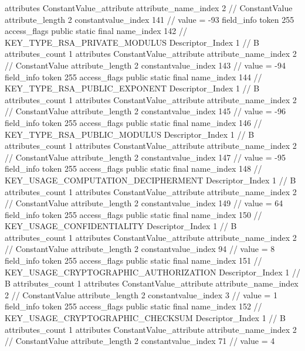 {{{{{				attributes {
				ConstantValue_attribute {
					attribute_name_index	2		// ConstantValue
					attribute_length	2
					constantvalue_index	141		// value = -93
				}
				}
			}
			field_info {
				token	255
				access_flags	public static final
				name_index	142		// KEY_TYPE_RSA_PRIVATE_MODULUS
				Descriptor_Index	1		// B
				attributes_count	1
				attributes {
				ConstantValue_attribute {
					attribute_name_index	2		// ConstantValue
					attribute_length	2
					constantvalue_index	143		// value = -94
				}
				}
			}
			field_info {
				token	255
				access_flags	public static final
				name_index	144		// KEY_TYPE_RSA_PUBLIC_EXPONENT
				Descriptor_Index	1		// B
				attributes_count	1
				attributes {
				ConstantValue_attribute {
					attribute_name_index	2		// ConstantValue
					attribute_length	2
					constantvalue_index	145		// value = -96
				}
				}
			}
			field_info {
				token	255
				access_flags	public static final
				name_index	146		// KEY_TYPE_RSA_PUBLIC_MODULUS
				Descriptor_Index	1		// B
				attributes_count	1
				attributes {
				ConstantValue_attribute {
					attribute_name_index	2		// ConstantValue
					attribute_length	2
					constantvalue_index	147		// value = -95
				}
				}
			}
			field_info {
				token	255
				access_flags	public static final
				name_index	148		// KEY_USAGE_COMPUTATION_DECIPHERMENT
				Descriptor_Index	1		// B
				attributes_count	1
				attributes {
				ConstantValue_attribute {
					attribute_name_index	2		// ConstantValue
					attribute_length	2
					constantvalue_index	149		// value = 64
				}
				}
			}
			field_info {
				token	255
				access_flags	public static final
				name_index	150		// KEY_USAGE_CONFIDENTIALITY
				Descriptor_Index	1		// B
				attributes_count	1
				attributes {
				ConstantValue_attribute {
					attribute_name_index	2		// ConstantValue
					attribute_length	2
					constantvalue_index	94		// value = 8
				}
				}
			}
			field_info {
				token	255
				access_flags	public static final
				name_index	151		// KEY_USAGE_CRYPTOGRAPHIC_AUTHORIZATION
				Descriptor_Index	1		// B
				attributes_count	1
				attributes {
				ConstantValue_attribute {
					attribute_name_index	2		// ConstantValue
					attribute_length	2
					constantvalue_index	3		// value = 1
				}
				}
			}
			field_info {
				token	255
				access_flags	public static final
				name_index	152		// KEY_USAGE_CRYPTOGRAPHIC_CHECKSUM
				Descriptor_Index	1		// B
				attributes_count	1
				attributes {
				ConstantValue_attribute {
					attribute_name_index	2		// ConstantValue
					attribute_length	2
					constantvalue_index	71		// value = 4
}}}}}}}
